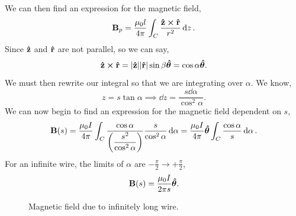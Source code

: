 \documentclass{book}
\def\R{0.33}
\begin{document}
We can then find an expression for the magnetic field,
\begin{equation}
    \vb{B}_p = \frac{\mu_0 l }{4\pi} \int_C \frac{\vu{z}\cross\vu{r}}{r^2}\dd{z}.
\end{equation}
Since $\vu{z}$ and $\vu{r}$ are not parallel, so we can say,
\begin{equation}
    \vu{z}\cross\vu{r} = |\vu{z}||\vu{r}|\sin\beta\vu*{\theta} = \cos\alpha\vu*{\theta}.
\end{equation}
We must then rewrite our integral so that we are integrating over $\alpha$. We know,
\begin{equation}
    z = s\tan\alpha \implies \dd{z} = \frac{s\dd{\alpha}}{\cos^2\alpha}.
\end{equation}
We can now begin to find an expression for the magnetic field dependent on $s$,
\begin{equation}
    \vb{B}(s) = \frac{\mu_0 I}{4\pi}\int_C \frac{\cos\alpha}{\left(\dfrac{s^2}{\cos^2\alpha}\right)}\frac{s}{\cos^2\alpha}\dd{\alpha} = \frac{\mu_0 I}{4\pi} \vu*{\theta} \int_C \frac{\cos\alpha}{s}\dd{\alpha}.
\end{equation}
For an infinite wire, the limits of $\alpha$ are $-\frac{\pi}{2} \to +\frac{\pi}{2}$,
\begin{equation}
    \vb{B}(s) = \frac{\mu_0 I}{2\pi s}\vu*{\theta}.
\end{equation}
\begin{figure}
    \centering
    \caption{Magnetic field due to infinitely long wire.}
    \label{fig:enter-label}
\end{figure}
\end{document}
